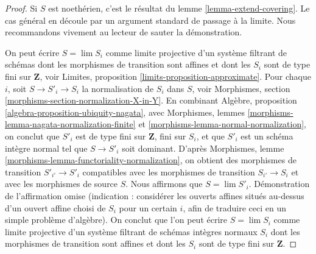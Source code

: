 \begin{proof}
Si $S$ est noethérien, c'est le résultat du
lemme \ref{lemma-extend-covering}. Le cas général
en découle par un argument standard de passage à la limite.
Nous recommandons vivement au lecteur de sauter la démonstration.

\medskip\noindent
On peut écrire $S = \lim S_i$ comme limite projective d'un système filtrant
de schémas dont les morphismes de transition sont affines et dont les $S_i$ sont
de type fini sur $\mathbf{Z}$, voir
Limites, proposition \ref{limits-proposition-approximate}.
Pour chaque $i$, soit $S \to S'_i \to S_i$ la normalisation
de $S_i$ dans $S$, voir
Morphismes, section \ref{morphisms-section-normalization-X-in-Y}.
En combinant Algèbre, proposition \ref{algebra-proposition-ubiquity-nagata},
avec Morphismes, lemmes \ref{morphisms-lemma-nagata-normalization-finite} et
\ref{morphisms-lemma-normal-normalization},
on conclut que $S'_i$ est de type fini sur $\mathbf{Z}$,
fini sur $S_i$, et que $S'_i$ est un schéma intègre normal
tel que $S \to S'_i$ soit dominant.
D'après Morphismes, lemme \ref{morphisms-lemma-functoriality-normalization},
on obtient des morphismes de transition $S'_{i'} \to S'_i$ compatibles
avec les morphismes de transition $S_{i'} \to S_i$ et avec
les morphismes de source $S$.
Nous affirmons que $S = \lim S'_i$. Démonstration de l'affirmation omise (indication :
considérer les ouverts affines situés au-dessus d'un ouvert affine choisi de $S_i$
pour un certain $i$, afin de traduire ceci en un simple problème
d'algèbre). On conclut que l'on peut écrire $S = \lim S_i$
comme limite projective d'un système filtrant de schémas intègres normaux $S_i$
dont les morphismes de transition sont affines et dont les $S_i$ sont
de type fini sur $\mathbf{Z}$.


\end{proof}
